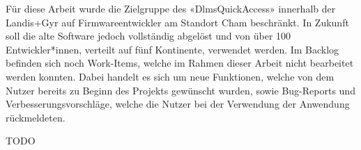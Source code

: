 Für diese Arbeit wurde die Zielgruppe des «DlmsQuickAccess» innerhalb der Landis+Gyr auf Firmwareentwickler am Standort Cham beschränkt.
In Zukunft soll die alte Software jedoch vollständig abgelöst und von über 100 Entwickler*innen, verteilt auf fünf Kontinente, verwendet werden.
Im Backlog befinden sich noch Work-Items, welche im Rahmen dieser Arbeit nicht bearbeitet werden konnten.
Dabei handelt es sich um neue Funktionen, welche von dem Nutzer bereits zu Beginn des Projekts gewünscht wurden, sowie Bug-Reports und Verbesserungsvorschläge, welche die Nutzer bei der Verwendung der Anwendung rückmeldeten.


TODO

\endgroup

\vfill
